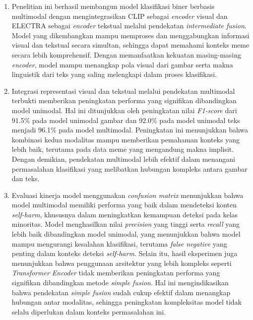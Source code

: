 \begin{enumerate}
    \item Penelitian ini berhasil membangun model klasifikasi biner berbasis multimodal dengan mengintegrasikan CLIP sebagai \textit{encoder} visual dan ELECTRA sebagai \textit{encoder} tekstual melalui pendekatan \textit{intermediate fusion}. Model yang dikembangkan mampu memproses dan menggabungkan informasi visual dan tekstual secara simultan, sehingga dapat memahami konteks meme secara lebih komprehensif. Dengan memanfaatkan kekuatan masing-masing \textit{encoder}, model mampu menangkap pola visual dari gambar serta makna linguistik dari teks yang saling melengkapi dalam proses klasifikasi.
    
    \item Integrasi representasi visual dan tekstual melalui pendekatan multimodal terbukti memberikan peningkatan performa yang signifikan dibandingkan model unimodal. Hal ini ditunjukkan oleh peningkatan nilai \textit{F1-score} dari 91.5\% pada model unimodal gambar dan 92.0\% pada model unimodal teks menjadi 96.1\% pada model multimodal. Peningkatan ini menunjukkan bahwa kombinasi kedua modalitas mampu memberikan pemahaman konteks yang lebih baik, terutama pada data meme yang mengandung makna implisit. Dengan demikian, pendekatan multimodal lebih efektif dalam menangani permasalahan klasifikasi yang melibatkan hubungan kompleks antara gambar dan teks.
    
    \item Evaluasi kinerja model menggunakan \textit{confusion matrix} menunjukkan bahwa model multimodal memiliki performa yang baik dalam mendeteksi konten \textit{self-harm}, khususnya dalam meningkatkan kemampuan deteksi pada kelas minoritas. Model menghasilkan nilai \textit{precision} yang tinggi serta \textit{recall} yang lebih baik dibandingkan model unimodal, yang menunjukkan bahwa model mampu mengurangi kesalahan klasifikasi, terutama \textit{false negative} yang penting dalam konteks deteksi \textit{self-harm}. Selain itu, hasil eksperimen juga menunjukkan bahwa penggunaan arsitektur yang lebih kompleks seperti \textit{Transformer Encoder} tidak memberikan peningkatan performa yang signifikan dibandingkan metode \textit{simple fusion}. Hal ini mengindikasikan bahwa pendekatan \textit{simple fusion} sudah cukup efektif dalam menangkap hubungan antar modalitas, sehingga peningkatan kompleksitas model tidak selalu diperlukan dalam konteks permasalahan ini.
\end{enumerate}



